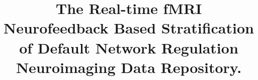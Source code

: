 
\title{The Real-time fMRI Neurofeedback Based Stratification of Default Network Regulation Neuroimaging Data Repository.}


